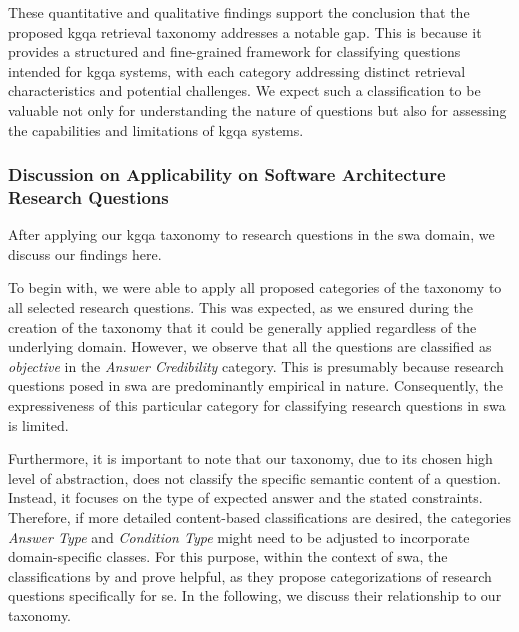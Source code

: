 These quantitative and qualitative findings support the conclusion that the proposed \gls{kgqa} retrieval taxonomy addresses a notable gap. This is because it provides a structured and fine-grained framework for classifying questions intended for \gls{kgqa} systems, with each category addressing distinct retrieval characteristics and potential challenges. We expect such a classification to be valuable not only for understanding the nature of questions but also for assessing the capabilities and limitations of \gls{kgqa} systems.

\subsubsection[Discussion on Applicability on SWA Research Questions]{Discussion on Applicability on Software Architecture Research Questions}

After applying our \gls{kgqa} taxonomy to research questions in the \gls{swa} domain, we discuss our findings here.

To begin with, we were able to apply all proposed categories of the taxonomy to all selected research questions. This was expected, as we ensured during the creation of the taxonomy that it could be generally applied regardless of the underlying domain. However, we observe that all the questions are classified as \emph{objective} in the \emph{Answer Credibility} category. This is presumably because research questions posed in \gls{swa} are predominantly empirical in nature. Consequently, the expressiveness of this particular category for classifying research questions in \gls{swa} is limited.

Furthermore, it is important to note that our taxonomy, due to its chosen high level of abstraction, does not classify the specific semantic content of a question. Instead, it focuses on the type of expected answer and the stated constraints. Therefore, if more detailed content-based classifications are desired, the categories \emph{Answer Type} and \emph{Condition Type} might need to be adjusted to incorporate domain-specific classes. For this purpose, within the context of \gls{swa}, the classifications by \textcite{shaw_writing_2003} and \textcite[287-290]{easterbrook_selecting_2008} prove helpful, as they propose categorizations of research questions specifically for \gls{se}. In the following, we discuss their relationship to our taxonomy.


